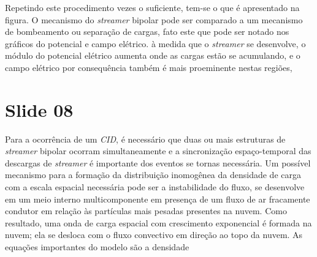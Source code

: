\documentclass[a4paper, 12pt, onecolumn,singlespacing]{article}
\begin{document}
	Repetindo este procedimento vezes o suficiente, tem-se o que é apresentado na figura. O mecanismo do \textit{streamer} bipolar pode ser comparado a um mecanismo de bombeamento ou separação de cargas, fato este que pode ser notado nos gráficos do potencial e campo elétrico. à medida que o \textit{streamer} se desenvolve, o módulo do potencial elétrico aumenta onde as cargas estão se acumulando, e o campo elétrico por consequência também é mais proeminente nestas regiões,
	
	\section{Slide 08}
	
	Para a ocorrência de um \textit{CID}, é necessário que duas ou mais estruturas de \textit{streamer} bipolar ocorram simultaneamente e a sincronização espaço-temporal das	descargas de \textit{streamer} é importante dos eventos se tornas necessária. Um possível mecanismo para a formação da distribuição inomogênea da densidade de carga com a escala espacial necessária pode ser a instabilidade do fluxo, se desenvolve em um meio interno multicomponente em presença de um fluxo de ar fracamente condutor em relação às partículas mais pesadas presentes na nuvem. Como resultado, uma onda de carga espacial com crescimento exponencial é formada na nuvem; ela se desloca com o fluxo convectivo em direção ao topo da nuvem.  As equações importantes do modelo são a densidade
	
	
	
\end{document}
